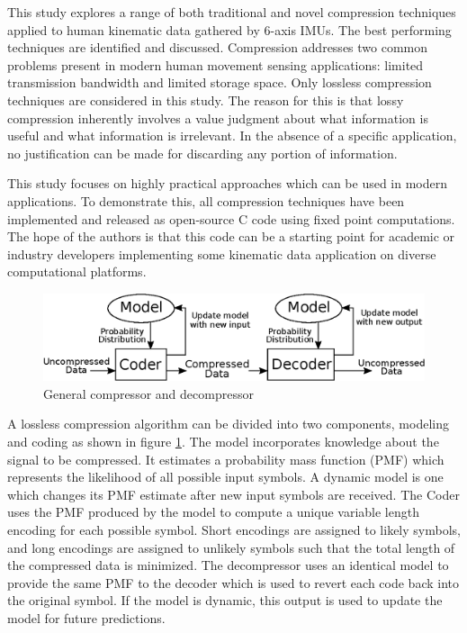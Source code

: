 \documentclass[journal]{IEEEtran}
\begin{document}
This study explores a range of both traditional and novel compression techniques applied to human kinematic data gathered by 6-axis IMUs. The best performing techniques are identified and discussed. Compression addresses two common problems present in modern human movement sensing applications: limited transmission bandwidth and limited storage space. Only lossless compression techniques are considered in this study. The reason for this is that lossy compression inherently involves a value judgment about what information is useful and what information is irrelevant. In the absence of a specific application, no justification can be made for discarding any portion of information.

This study focuses on highly practical approaches which can be used in modern applications. To demonstrate this, all compression techniques have been implemented and released as open-source C code using fixed point computations. The hope of the authors is that this code can be a starting point for academic or industry developers implementing some kinematic data application on diverse computational platforms.

\begin{figure}
  \includegraphics[width=\linewidth]{general_compressor.eps}
  \caption{General compressor and decompressor}
  \label{fig:general_compressor}
\end{figure}

A lossless compression algorithm can be divided into two components, modeling and coding as shown in figure \ref{fig:general_compressor}. The model incorporates knowledge about the signal to be compressed. It estimates a probability mass function (PMF) which represents the likelihood of all possible input symbols. A dynamic model is one which changes its PMF estimate after new input symbols are received. The Coder uses the PMF produced by the model to compute a unique variable length encoding for each possible symbol. Short encodings are assigned to likely symbols, and long encodings are assigned to unlikely symbols such that the total length of the compressed data is minimized. The decompressor uses an identical model to provide the same PMF to the decoder which is used to revert each code back into the original symbol. If the model is dynamic, this output is used to update the model for future predictions.
\end{document}
